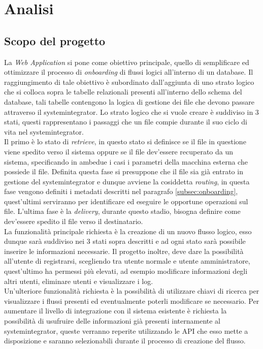 \chapter{Analisi}
\label{chap:analisi}


\section{Scopo del progetto}
La \textit{Web Application} si pone come obiettivo principale, quello di semplificare ed ottimizzare il processo di \textit{onboarding} di flussi logici all'interno di un database. Il raggiungimento di tale obiettivo è subordinato dall'aggiunta di uno strato logico che si colloca sopra le tabelle relazionali presenti all'interno dello \gls{schema} del database, tali tabelle contengono la logica di gestione dei file che devono passare attraverso il \gls{systemintegrator}. Lo strato logico che si vuole creare è suddiviso in 3 stati, questi rappresentano i passaggi che un file compie durante il suo ciclo di vita nel \gls{systemintegrator}. \\
Il primo è lo stato di \textit{retrieve}, in questo stato si definisce se il file in questione viene spedito verso il sistema oppure se il file dev'essere recuperato da un sistema, specificando in ambedue i casi i parametri della macchina esterna che possiede il file. Definita questa fase si presuppone che il file sia già entrato in gestione del \gls{systemintegrator} e dunque avviene la cosiddetta  \textit{routing}, in questa fase vengono definiti i metadati descritti nel paragrafo \ref{subsec:onboarding}, quest'ultimi serviranno per identificare ed eseguire le opportune operazioni sul file. L'ultima fase è la \textit{delivery}, durante questo stadio, bisogna definire come dev'essere spedito il file verso il destinatario.\\
La funzionalità principale richiesta è la creazione di un nuovo flusso logico, esso dunque sarà suddiviso nei 3 stati sopra descritti e ad ogni stato sarà possibile inserire le informazioni necessarie.
Il progetto inoltre, deve dare la possibilità all'utente di registrarsi, scegliendo tra utente normale e  utente amministratore, quest'ultimo ha permessi più elevati, ad esempio modificare informazioni degli altri utenti, eliminare utenti e visualizzare i \gls{log}. \\
Un'ulteriore funzionalità richiesta è la possibilità di utilizzare chiavi di ricerca per visualizzare i flussi presenti ed eventualmente poterli modificare se necessario.
Per aumentare il livello di integrazione con il sistema esistente è richiesta la possibilità di usufruire delle informazioni già presenti internamente al  \gls{systemintegrator}, queste verranno reperite utilizzando le \gls{API} che esso mette a disposizione e saranno selezionabili durante il processo di creazione del flusso.

